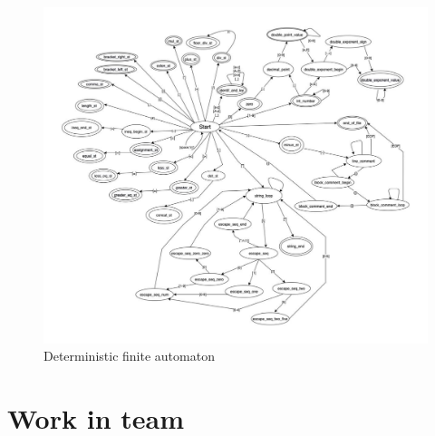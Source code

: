\documentclass[11pt]{article}
\begin{document}
    \begin{figure}[!ht]
		\centering
		\includegraphics[width=0.95\linewidth]{pics/Konecny_automat.pdf}
		\caption{Deterministic finite automaton}
        \label{figure:pics/Konecny_automat.pdf}
	\end{figure}

\section{Work in team}
\end{document}
